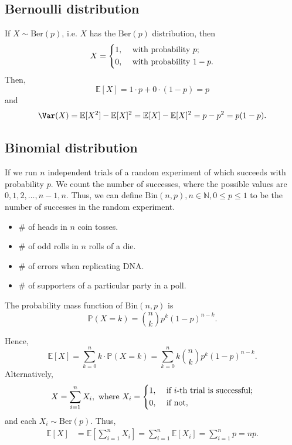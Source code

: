 \subsection{Bernoulli distribution}
\begin{definition}
    If \(X \sim \mathrm{Ber}(p) \), i.e. \(X\) has the \(\mathrm{Ber}(p) \) distribution, then 
    \[
        X = \begin{dcases}
            1, &\text{ with probability } p ;\\
            0, &\text{ with probability } 1-p .
        \end{dcases}
    \]
    Then, 
    \[
        \mathbb{E} [X] = 1 \cdot p + 0 \cdot (1 - p) = p
    \]    
    and 
    \[
        \Var(X) = \mathbb{E} [X^2] - \mathbb{E} [X]^2 = \mathbb{E} [X] - \mathbb{E} [X]^2 = p - p^2 = p(1 - p).
    \]
\end{definition}

\subsection{Binomial distribution}
\begin{definition}
    If we run \(n\) independent trials of a random experiment of which succeeds with probability \(p\). We count the number of successes, where the possible values are \(0, 1, 2, \dots , n - 1, n\). Thus, we can define \(\mathrm{Bin}(n, p), n \in \mathbb{N} , 0 \le p \le 1 \) to be the number of successes in the random experiment. 
\end{definition}

\begin{eg}
    \hfill 
    \begin{itemize}
        \item \(\#\) of heads in \(n\) coin tosses. 
        \item \(\#\) of odd rolls in \(n\) rolls of a die. 
        \item \(\#\) of errors when replicating DNA. 
        \item \(\#\) of supporters of a particular party in a poll.      
    \end{itemize}
\end{eg}

The probability mass function of \(\mathrm{Bin}(n, p)\) is 
\[
    \mathbb{P} (X = k) = \binom{n}{k} p^k (1 - p)^{n - k}.
\] 

Hence,
\[
    \mathbb{E} [X] = \sum_{k=0}^n k \cdot \mathbb{P} (X = k) = \sum_{k=0}^n k \binom{n}{k} p^k (1 - p)^{n-k}.  
\]
Alternatively,
\[
    X = \sum_{i=1}^n X_i, \text{ where } X_i = \begin{dcases}
        1, &\text{ if } i \text{-th trial is successful}  ;\\
        0, &\text{ if not}  ,
    \end{dcases} 
\]
and each \(X_i \sim \mathrm{Ber}(p) \). Thus,
\begin{align*}
    \mathbb{E} [X] &= \mathbb{E} \left[ \sum_{i=1}^n X_i  \right] = \sum_{i=1}^n \mathbb{E} [X_i] = \sum_{i=1}^n p = np.   
\end{align*} 

